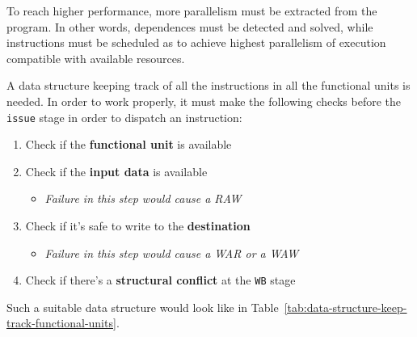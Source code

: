 \documentclass[english]{article}
\begin{document}
To reach higher performance, more parallelism must be extracted from the program.
In other words,  dependences must be detected and solved, while instructions must be scheduled as to achieve highest parallelism of execution compatible with available resources.

A data structure keeping track of all the instructions in all the functional units is needed.
In order to work properly, it must make the following checks before the \texttt{issue} stage in order to dispatch an instruction:

\begin{enumerate}
  \item Check if the \textbf{functional unit} is available
  \item Check if the \textbf{input data} is available
        \begin{itemize}
          \item \textit{Failure in this step would cause a RAW}
        \end{itemize}
  \item Check if it's safe to write to the \textbf{destination}
        \begin{itemize}
          \item \textit{Failure in this step would cause a WAR or a WAW}
        \end{itemize}
  \item Check if there's a \textbf{structural conflict} at the \texttt{WB} stage
\end{enumerate}

Such a suitable data structure would look like in Table~\ref{tab:data-structure-keep-track-functional-units}.
\end{document}
